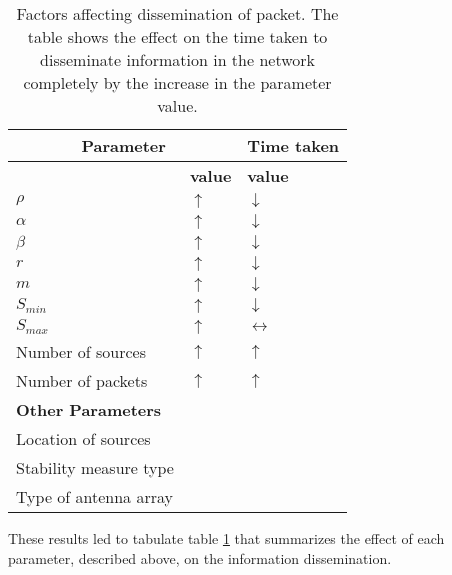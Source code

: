 \documentclass[preprint, twocolumn,5p]{elsarticle}
\begin{document}
    \begin{table}
        \centering
        \begin{tabular}{|l|l|l|}
            \hline
            \multicolumn{2}{|c|}{\textbf{Parameter}}&\textbf{Time taken}\\
            \hline
            &\textbf{value}&\textbf{value}\\
            \hline
            $\rho$ & $\uparrow$ & $\downarrow$ \\
            $\alpha$ &$\uparrow$& $\downarrow$\\
            $\beta$ & $\uparrow$&$\downarrow$\\
            $r$ & $\uparrow$&$\downarrow$\\
            $m$ & $\uparrow$&$\downarrow$\\
            $S_{min}$ & $\uparrow$ & $\downarrow$\\
            $S_{max}$ & $\uparrow$&$\leftrightarrow$\\
            Number of sources & $\uparrow$ & $\uparrow$\\
            Number of packets & $\uparrow$ & $\uparrow$\\
            \hline
            \textbf{Other Parameters}&&\\
            \hline
            Location of sources &&\\
            Stability measure type &&\\
            Type of antenna array &&\\
            \hline
        \end{tabular}
        \caption{Factors affecting dissemination of packet. The table shows the effect on the time taken to disseminate information in the network completely by the increase in the parameter value.}
        \label{table:parameteraffect}
    \end{table}

    These results led to tabulate table \ref{table:parameteraffect} that summarizes the effect of each parameter, described above, on the information dissemination.
\end{document}
